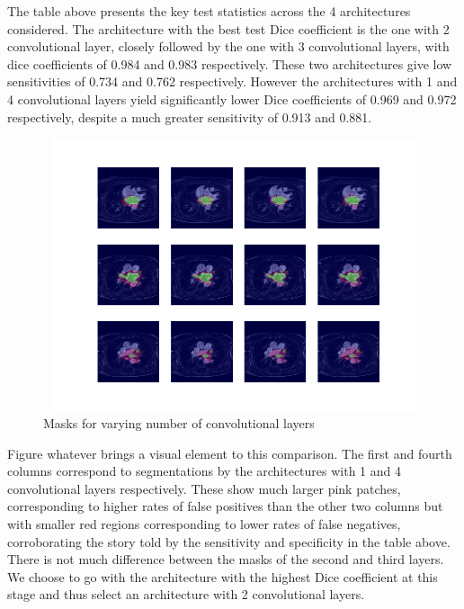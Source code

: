 \noindent The table above presents the key test statistics across the 4 architectures considered. The architecture with the best test Dice coefficient is the one with 2 convolutional layer, closely followed by the one with 3 convolutional layers, with dice coefficients of 0.984 and 0.983 respectively. These two architectures give low sensitivities of 0.734 and 0.762 respectively. However the architectures with 1 and 4 convolutional layers yield significantly lower Dice coefficients of 0.969 and 0.972 respectively, despite a much greater sensitivity of 0.913 and 0.881. \\

\begin{figure}
\centering
\includegraphics[trim=2.5cm 1.5cm 2cm 1.5cm, clip=true, height=80mm, width=150mm]{Chapter3/mask_results_varying_number_of_convolutional_layers.png}
\caption{Masks for varying number of convolutional layers}
\end{figure}

\noindent Figure whatever brings a visual element to this comparison. The first and fourth columns correspond to segmentations by the architectures with 1 and 4 convolutional layers respectively. These show much larger pink patches, corresponding to higher rates of false positives than the other two columns but with smaller red regions corresponding to lower rates of false negatives, corroborating the story told by the sensitivity and specificity in the table above. There is not much difference between the masks of the second and third layers.\\

\noindent We choose to go with the architecture with the highest Dice coefficient at this stage and thus select an architecture with 2 convolutional layers. 

